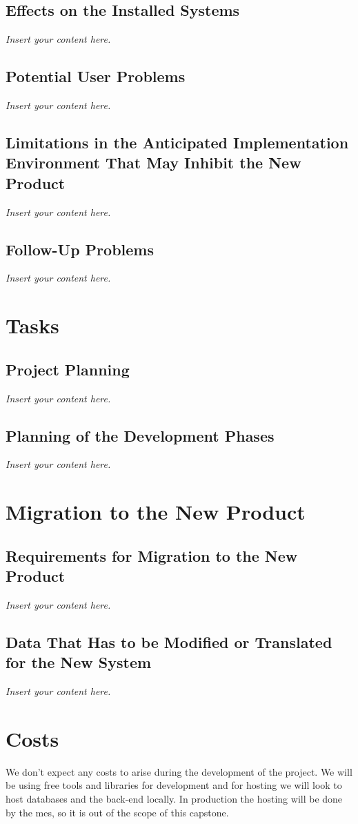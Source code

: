 \documentclass[12pt]{article}
\newcommand{\lips}{\textit{Insert your content here.}}
\begin{document}
\subsection{Effects on the Installed Systems}
\lips
\subsection{Potential User Problems}
\lips
\subsection{Limitations in the Anticipated Implementation Environment That May
Inhibit the New Product}
\lips
\subsection{Follow-Up Problems}
\lips

\section{Tasks}
\subsection{Project Planning}
\lips
\subsection{Planning of the Development Phases}
\lips

\section{Migration to the New Product}
\subsection{Requirements for Migration to the New Product}
\lips
\subsection{Data That Has to be Modified or Translated for the New System}
\lips

\section{Costs}
We don't expect any costs to arise during the development of the project. We will be using free tools and libraries for
development and for hosting we will look to host databases and the back-end locally. In production the hosting will be
done by the \gls{mes}, so it is out of the scope of this capstone.
\end{document}
